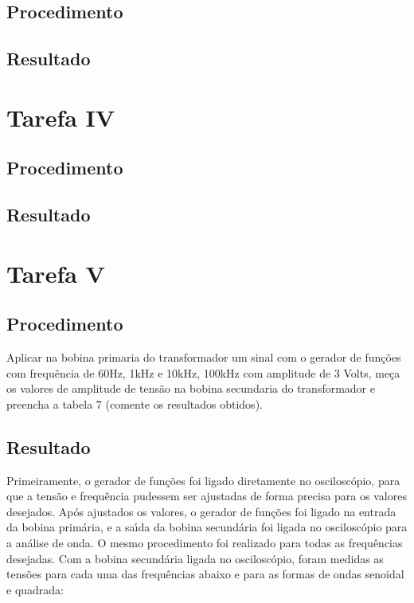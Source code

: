 \subsection{Procedimento}
\subsection{Resultado}

\section{Tarefa IV}
\subsection{Procedimento}
\subsection{Resultado}

\section{Tarefa V}
\subsection{Procedimento}
Aplicar na bobina primaria do transformador um sinal com o gerador de fun\c{c}\~{o}es com frequ\^{e}ncia de 60Hz, 1kHz e 10kHz, 100kHz com amplitude de 3 Volts, me\c{c}a os valores de amplitude de tens\~{a}o na bobina secundaria do transformador e preencha a tabela 7 (comente os resultados obtidos).
\subsection{Resultado}
Primeiramente, o gerador de fun\c{c}\~{o}es foi ligado diretamente no oscilosc\'{o}pio, para que a tens\~{a}o e frequ\^{e}ncia pudessem ser ajustadas de forma precisa para os valores desejados. Ap\'{o}s ajustados os valores, o gerador de fun\c{c}\~{o}es foi ligado na entrada da bobina prim\'{a}ria, e a sa\'{\i}da da bobina secund\'{a}ria foi ligada no oscilosc\'{o}pio para a an\'{a}lise de onda. O mesmo procedimento foi realizado para todas as frequ\^{e}ncias desejadas. Com a bobina secund\'{a}ria ligada no oscilosc\'{o}pio, foram medidas as tens\~{o}es para cada uma das frequ\^{e}ncias abaixo e para as formas de ondas senoidal e quadrada: \\


